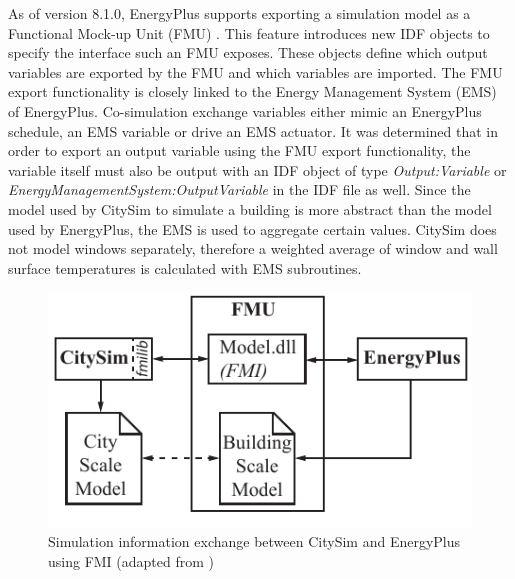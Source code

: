 \documentclass{tBPS2e}
\theoremstyle{plain}
\theoremstyle{definition}
\theoremstyle{remark}
\begin{document}
As of version 8.1.0, EnergyPlus supports exporting a simulation model as a Functional Mock-up Unit (FMU) \citep{Nouidui:2014hq}. This feature introduces new IDF objects to specify the interface such an FMU exposes. These objects define which output variables are exported by the FMU and which variables are imported. The FMU export functionality is closely linked to the Energy Management System (EMS) of EnergyPlus. Co-simulation exchange variables either mimic an EnergyPlus schedule, an EMS variable or drive an EMS actuator. It was determined that in order to export an output variable using the FMU export functionality, the variable itself must also be output with an IDF object of type \emph{Output:Variable} or \emph{EnergyManagementSystem:OutputVariable} in the IDF file as well. Since the model used by CitySim to simulate a building is more abstract than the model used by EnergyPlus, the EMS is used to aggregate certain values. CitySim does not model windows separately, therefore a weighted average of window and wall surface temperatures is calculated with EMS subroutines.

\begin{figure}[H]
\centering
\includegraphics[scale=0.7]{figures/UMEM_FMU_Overview}
\caption{Simulation information exchange between CitySim and EnergyPlus using FMI (adapted from \cite{thomas2014multiscale})}
\label{fig:FMUOverview}
\end{figure}

\end{document}
